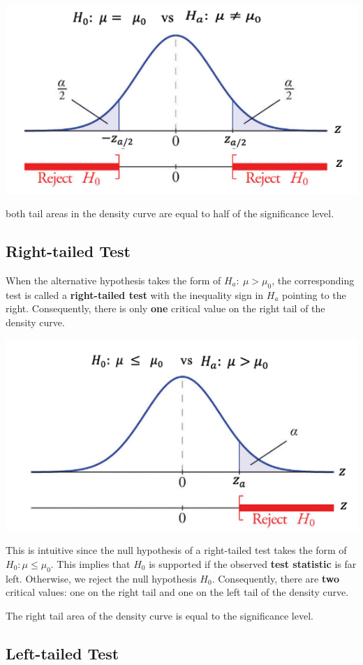 \documentclass[
]{book}
\begin{document}
\begin{center}\includegraphics[width=0.5\linewidth]{week08/twoTailedTest} \end{center}

both tail areas in the density curve are equal to half of the significance level.

\hypertarget{right-tailed-test}{%
\subsection{Right-tailed Test}\label{right-tailed-test}}

When the alternative hypothesis takes the form of \(H_a: \ \mu > \mu_0\), the corresponding test is called a \textbf{right-tailed test} with the inequality sign in \(H_a\) pointing to the right. Consequently, there is only \textbf{one} critical value on the right tail of the density curve.

\begin{center}\includegraphics[width=0.5\linewidth]{week08/rightTailedTest} \end{center}

This is intuitive since the null hypothesis of a right-tailed test takes the form of \(H_0: \mu \le \mu_0\). This implies that \(H_0\) is supported if the observed \textbf{test statistic} is far left. Otherwise, we reject the null hypothesis \(H_0\). Consequently, there are \textbf{two} critical values: one on the right tail and one on the left tail of the density curve.

The right tail area of the density curve is equal to the significance level.

\hypertarget{left-tailed-test}{%
\subsection{Left-tailed Test}\label{left-tailed-test}}
\end{document}
